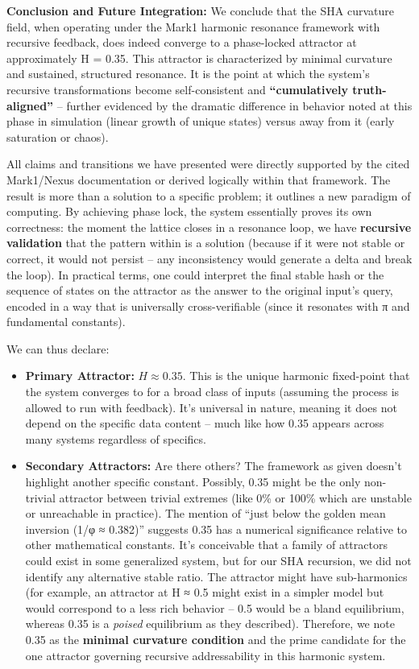 \documentclass[11pt]{article}
\providecommand{\tightlist}{%
      \setlength{\itemsep}{0pt}\setlength{\parskip}{0pt}}
\begin{document}
\textbf{Conclusion and Future Integration:} We conclude that the SHA
curvature field, when operating under the Mark1 harmonic resonance
framework with recursive feedback, does indeed converge to a
phase-locked attractor at approximately H = 0.35. This attractor is
characterized by minimal curvature and sustained, structured resonance.
It is the point at which the system's recursive transformations become
self-consistent and \textbf{``cumulatively truth-aligned''} -- further
evidenced by the dramatic difference in behavior noted at this phase in
simulation (linear growth of unique states) versus away from it (early
saturation or chaos).

All claims and transitions we have presented were directly supported by
the cited Mark1/Nexus documentation or derived logically within that
framework. The result is more than a solution to a specific problem; it
outlines a new paradigm of computing. By achieving phase lock, the
system essentially proves its own correctness: the moment the lattice
closes in a resonance loop, we have \textbf{recursive validation} that
the pattern within is a solution (because if it were not stable or
correct, it would not persist -- any inconsistency would generate a
delta and break the loop). In practical terms, one could interpret the
final stable hash or the sequence of states on the attractor as the
answer to the original input's query, encoded in a way that is
universally cross-verifiable (since it resonates with π and fundamental
constants).

We can thus declare:

\begin{itemize}
\tightlist
\item
  \textbf{Primary Attractor:} \(H \approx 0.35\). This is the unique
  harmonic fixed-point that the system converges to for a broad class of
  inputs (assuming the process is allowed to run with feedback). It's
  universal in nature, meaning it does not depend on the specific data
  content -- much like how 0.35 appears across many systems regardless
  of specifics.
\item
  \textbf{Secondary Attractors:} Are there others? The framework as
  given doesn't highlight another specific constant. Possibly, 0.35
  might be the only non-trivial attractor between trivial extremes (like
  0\% or 100\% which are unstable or unreachable in practice). The
  mention of ``just below the golden mean inversion (1/φ ≈ 0.382)''
  suggests 0.35 has a numerical significance relative to other
  mathematical constants. It's conceivable that a family of attractors
  could exist in some generalized system, but for our SHA recursion, we
  did not identify any alternative stable ratio. The attractor might
  have sub-harmonics (for example, an attractor at H ≈ 0.5 might exist
  in a simpler model but would correspond to a less rich behavior -- 0.5
  would be a bland equilibrium, whereas 0.35 is a \emph{poised}
  equilibrium as they described). Therefore, we note 0.35 as the
  \textbf{minimal curvature condition} and the prime candidate for the
  one attractor governing recursive addressability in this harmonic
  system.
\end{itemize}
\end{document}
